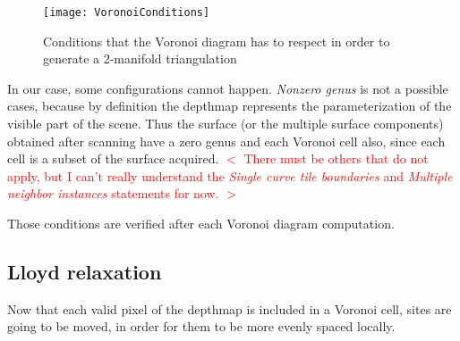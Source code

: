 \documentclass[11pt,fleqn]{book} %
\newcommand{\arnaud}[1]{\textcolor{red}{$<$ #1 $>$}}
\begin{document}
\begin{figure}[ht]
\centering\texttt{[image: VoronoiConditions]}
\caption{Conditions that the Voronoi diagram has to respect in order to generate a 2-manifold triangulation \cite{Gus07}}
\label{fig:voronoi_conditions}
\end{figure}

In our case, some configurations cannot happen.
\textit{Nonzero genus} is not a possible cases, because by definition the depthmap represents the parameterization of the visible part of the scene. Thus the surface (or the multiple surface components) obtained after scanning have a zero genus and each Voronoi cell also, since each cell is a subset of the surface acquired.
\arnaud{There must be others that do not apply, but I can't really understand the \textit{Single curve tile boundaries} and \textit{Multiple neighbor instances} statements for now.}

Those conditions are verified after each Voronoi diagram computation. 




\subsection{Lloyd relaxation}
Now that each valid pixel of the depthmap is included in a Voronoi cell, sites are going to be moved, in order for them to be more evenly spaced locally.
\end{document}
